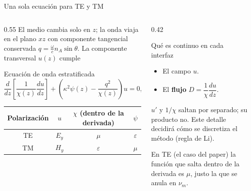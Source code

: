 \documentclass[aspectratio=169,10pt]{beamer}
\newcommand{\num}{\nu_m}
\begin{document}
\begin{frame}{Una sola ecuación para TE y TM}
  \begin{columns}[T]
    \begin{column}{0.55\textwidth}
      \small
      El medio cambia solo en $z$; la onda viaja en el plano $xz$ con componente tangencial
      conservada $q=\frac{\omega}{c}n_A\sin\theta$. La componente transversal $u(z)$ cumple
      \begin{block}{Ecuación de onda estratificada}
        \[\frac{d}{dz}\!\left[\frac{1}{\chi(z)}\frac{du}{dz}\right]
          +\left(\kappa^2\psi(z)-\frac{q^2}{\chi(z)}\right)u=0,\quad \kappa=\frac{\omega}{c}\]
      \end{block}
      \begin{center}
        \begin{tabular}{cccc}
          \toprule
          Polarización & $u$ & $\chi$ (dentro de la derivada) & $\psi$ \\
          \midrule
          TE & $E_y$ & $\mu$ & $\varepsilon$ \\
          TM & $H_y$ & $\varepsilon$ & $\mu$ \\
          \bottomrule
        \end{tabular}
      \end{center}
    \end{column}
    \begin{column}{0.42\textwidth}
      \begin{alertblock}{Qué es continuo en cada interfaz}
        \small
        \begin{itemize}
          \item El campo $u$.
          \item El \textbf{flujo} $D=\dfrac{1}{\chi}\dfrac{du}{dz}$.
        \end{itemize}
        $u'$ y $1/\chi$ saltan por separado; su producto no. Este detalle decidirá cómo se
        discretiza el método (regla de Li).
      \end{alertblock}
      \small En TE (el caso del paper) la función que salta dentro de la derivada es $\mu$, justo la
      que se anula en $\num$.
    \end{column}
  \end{columns}
\end{frame}
\end{document}
